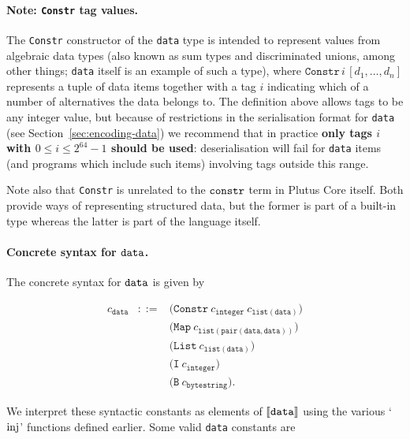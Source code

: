 \paragraph{Note: \texttt{Constr} tag values.}
\label{note:constr-tag-values}
The \texttt{Constr} constructor of the \texttt{data} type is intended to
represent values from algebraic data types (also known as sum types and
discriminated unions, among other things; \texttt{data} itself is an example of
such a type), where $\mathtt{Constr}\, i\, [d_1,\ldots,d_n]$
represents a tuple of data items together with a tag $i$ indicating which of a
number of alternatives the data belongs to.  The definition above allows tags to
be any integer value, but because of restrictions in the serialisation format
for \texttt{data} (see Section~\ref{sec:encoding-data}) we recommend that in
practice \textbf{only tags $i$ with $0 \leq i \leq 2^{64}-1$ should be used}:
deserialisation will fail for \texttt{data} items (and programs which include
such items) involving tags outside this range.

Note also that \texttt{Constr} is unrelated to the $\texttt{constr}$ term in
Plutus Core itself. Both provide ways of representing structured data, but
the former is part of a built-in type whereas the latter is part of the language
itself.

\newcommand{\syn}[1]{c_{\mathtt{{#1}}}}

\paragraph{Concrete syntax for $\mathtt{data}$.}
The concrete syntax for $\mathtt{data}$ is given by

\begin{minipage}{0.6\linewidth}
    \centering
    \[\begin{array}{rcl}
    \syn{data} & ::= & \texttt{(Constr} \ \syn{integer} \ \syn{list(data)} \texttt{)}\\
               &  & \texttt{(Map} \ \syn{list(pair(data,data))} \texttt{)}\\
               &  & \texttt{(List} \ \syn{list(data)} \texttt{)}\\
               &  & \texttt{(I} \ \syn{integer} \texttt{)}\\
               &  & \texttt{(B} \ \syn{bytestring} \texttt{)}.
    \end{array}\]
    \label{fig:data-concrete-syntax}
\end{minipage}

\noindent We interpret these syntactic constants as elements of $\llbracket\mathit{\mathtt{data}}\rrbracket$ using
the various `$\operatorname{inj}$' functions defined earlier.  Some valid \texttt{data}
constants are


